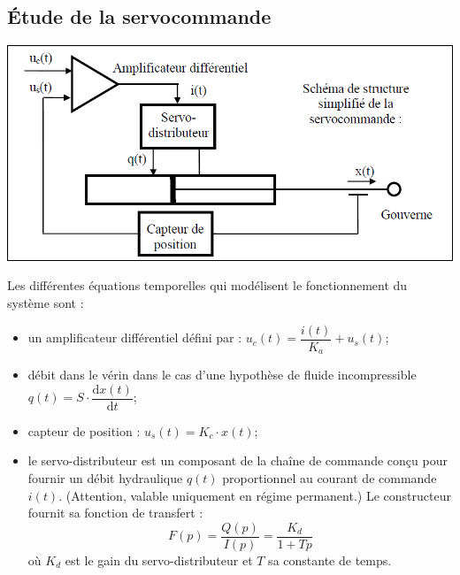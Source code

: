 \documentclass[10pt,fleqn]{article} %
\begin{document}
\begin{multicols}{2}
\begin{obj}
\end{obj}

\subsection*{Étude de la servocommande}
\ifprof \else

\begin{center}
\includegraphics[width=.7\linewidth]{images/img5}
\end{center}

Les différentes équations temporelles qui modélisent le fonctionnement du système sont :
\begin{itemize}
\item un amplificateur différentiel défini par : $u_c(t)=\dfrac{i(t)}{K_a}+u_s(t)$;
\item débit dans le vérin dans le cas d'une hypothèse de fluide incompressible $q(t)=S\cdot\dfrac{\text{d}x(t)}{\text{d}t}$;
\item capteur de position : $u_s(t)=K_c\cdot x(t)$;
\item le servo-distributeur est un composant de la chaîne de commande conçu pour fournir un débit hydraulique $q(t)$ proportionnel au courant de commande $i(t)$. (Attention, valable uniquement en régime permanent.) Le constructeur fournit sa fonction de transfert :
$$
F(p)=\dfrac{Q(p)}{I(p)}=\dfrac{K_d}{1+Tp}
$$
où $K_d$ est le gain du servo-distributeur et $T$ sa constante de temps.
\end{itemize}


\fi




\end{multicols}
\end{document}
